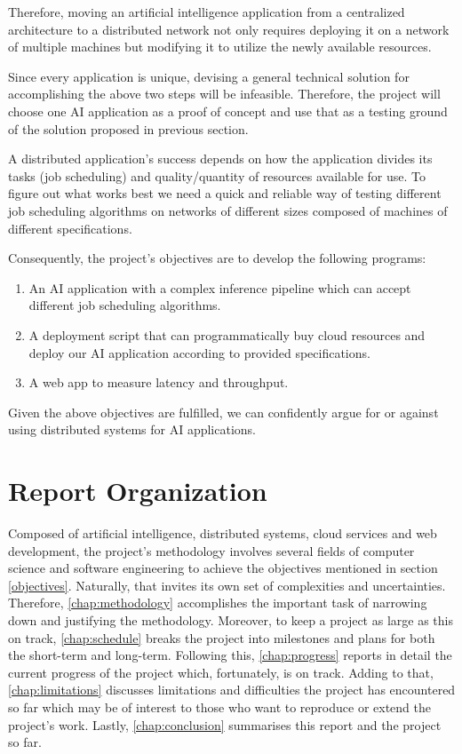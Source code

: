 \documentclass{report}
\begin{document}
Therefore, moving an artificial intelligence application from a centralized architecture to a distributed network not only requires deploying it on a network of multiple machines but modifying it to utilize the newly available resources.

Since every application is unique, devising a general technical solution for accomplishing the above two steps will be infeasible. Therefore, the project will choose one AI application as a proof of concept and use that as a testing ground of the solution proposed in previous section.

A distributed application's success depends on how the application divides its tasks (job scheduling) and quality/quantity of resources available for use. To figure out what works best we need a quick and reliable way of testing different job scheduling algorithms on networks of different sizes composed of machines of different specifications.

Consequently, the project's objectives are to develop the following programs:
\begin{enumerate}
  \item An AI application with a complex inference pipeline which can accept different job scheduling algorithms.
  \item A deployment script that can programmatically buy cloud resources and deploy our AI application according to provided specifications.
  \item A web app to measure latency and throughput.
\end{enumerate}

Given the above objectives are fulfilled, we can confidently argue for or against using distributed systems for AI applications.

\section{Report Organization}
Composed of artificial intelligence, distributed systems, cloud services and web development, the project's methodology involves several fields of computer science and software engineering to achieve the objectives mentioned in section \ref{objectives}.
Naturally, that invites its own set of complexities and uncertainties. 
Therefore, \cref{chap:methodology} accomplishes the important task of narrowing down and justifying the methodology.
Moreover, to keep a project as large as this on track, \cref{chap:schedule} breaks the project into milestones and plans for both the short-term and long-term.
Following this, \cref{chap:progress} reports in detail the current progress of the project which, fortunately, is on track.
Adding to that, \cref{chap:limitations} discusses limitations and difficulties the project has encountered so far which may be of interest to those who want to reproduce or extend the project's work.
Lastly, \cref{chap:conclusion} summarises this report and the project so far.
\end{document}
